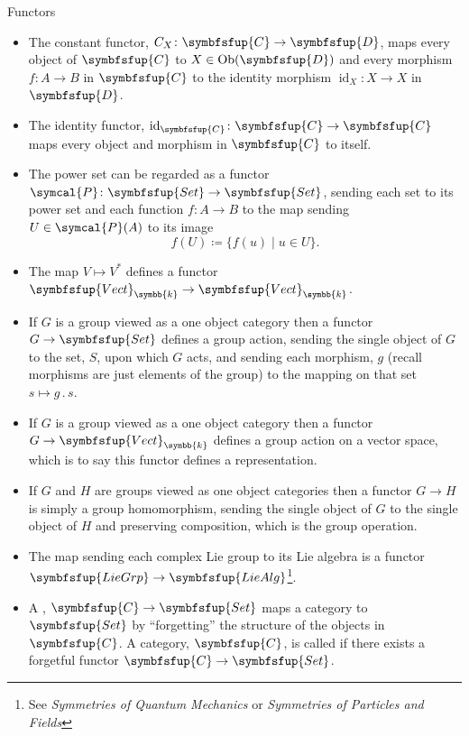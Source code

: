 \documentclass[fleqn]{NotesClass}
\makeatletter
\newcommand*{\course}[1]{\textit{#1}}
\newcommand{\cat}[1]{\symbfsfup{#1}}
\newcommand{\c@egory}[1]{\symbfsfup{#1}}
\newcommand{\Set}{\c@egory{Set}}
\renewcommand{\field}{\symbb{k}}
\newcommand{\Vect}[1][\field]{{\c@egory{Vect}_{#1}}}
\newcommand{\LieGrp}{\c@egory{LieGrp}}
\newcommand{\LieAlg}{\c@egory{LieAlg}}
\DeclareMathOperator{\Ob}{Ob}
\DeclareMathOperator{\id}{id}
\newcommand{\powerset}{\symcal{P}}
\makeatother
\begin{document}
    \begin{exm}{Functors}{}
        \begin{itemize}
            \item The constant functor, \(C_X \colon \cat{C} \to \cat{D}\), maps every object of \(\cat{C}\) to \(X \in \Ob(\cat{D})\) and every morphism \(f \colon A \to B\) in \(\cat{C}\) to the identity morphism \(\id_X \colon X \to X\) in \(\cat{D}\).
            \item The identity functor, \(\id_{\cat{C}} \colon \cat{C} \to \cat{C}\) maps every object and morphism in \(\cat{C}\) to itself.
            \item The power set can be regarded as a functor \(\powerset\colon \Set \to \Set\), sending each set to its power set and each function \(f \colon A \to B\) to the map sending \(U \in \powerset(A)\) to its image
            \begin{equation}
                f(U) \coloneqq \{f(u) \mid u \in U\}.
            \end{equation}
            \item The map \(V \mapsto V^*\) defines a functor \(\Vect \to \Vect\).
            \item If \(G\) is a group viewed as a one object category then a functor \(G \to \Set\) defines a group action, sending the single object of \(G\) to the set, \(S\), upon which \(G\) acts, and sending each morphism, \(g\) (recall morphisms are just elements of the group) to the mapping on that set \(s \mapsto g \mathbin{.} s\).
            \item If \(G\) is a group viewed as a one object category then a functor \(G \to \Vect\) defines a group action on a vector space, which is to say this functor defines a representation.
            \item If \(G\) and \(H\) are groups viewed as one object categories then a functor \(G \to H\) is simply a group homomorphism, sending the single object of \(G\) to the single object of \(H\) and preserving composition, which is the group operation.
            \item The map sending each complex Lie group to its Lie algebra is a functor \(\LieGrp \to \LieAlg\)\footnote{See \course{Symmetries of Quantum Mechanics} or \course{Symmetries of Particles and Fields}}.
            \item A , \(\cat{C} \to \Set\) maps a category to \(\Set\) by \enquote{forgetting} the structure of the objects in \(\cat{C}\).
            A category, \(\cat{C}\), is called  if there exists a forgetful functor \(\cat{C} \to \Set\).

\end{itemize}
\end{exm}
\end{document}
